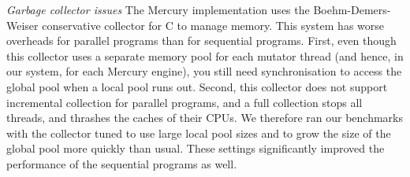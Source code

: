 
\emph{Garbage collector issues}
The Mercury implementation uses the Boehm-Demers-Weiser
conservative collector for C  to manage memory.
This system has worse overheads
for parallel programs than for sequential programs.
First, even though this collector uses
a separate memory pool for each mutator thread
(and hence, in our system, for each Mercury engine),
you still need synchronisation to access the global pool
when a local pool runs out.
Second, this collector
does not support incremental collection for parallel programs,
and a full collection stops all threads,
and thrashes the caches of their CPUs.
We therefore ran our benchmarks with the collector tuned
to use large local pool sizes
and to grow the size of the global pool more quickly than usual.
These settings significantly improved
the performance of the sequential programs as well.


